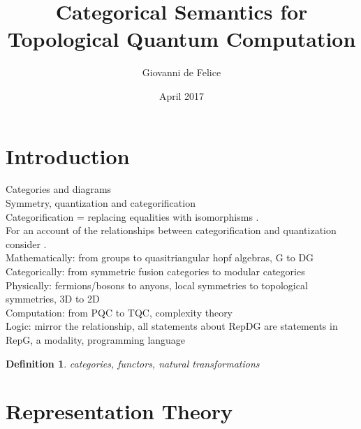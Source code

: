 \documentclass{article}
\title{Categorical Semantics for Topological Quantum Computation}
\author{Giovanni de Felice}
\date{April 2017}
\newtheorem{definition}{Definition}
\begin{document}
\maketitle
\tableofcontents

\pagebreak
\section{Introduction}
Categories and diagrams \\
Symmetry, quantization and categorification \\
Categorification = replacing equalities with isomorphisms \cite{Baez98}.\\
For an account of the relationships between categorification and quantization consider \cite{Rowell17}.\\
Mathematically: from groups to quasitriangular hopf algebras, G to DG\\
Categorically: from symmetric fusion categories to modular categories\\
Physically: fermions/bosons to anyons, local symmetries to topological symmetries, 3D to 2D\\
Computation: from PQC to TQC, complexity theory\\
Logic: mirror the relationship, all statements about RepDG are statements in RepG, a modality, programming language
\begin{definition}
categories, functors, natural transformations
\end{definition}
\section{Representation Theory}
\end{document}
